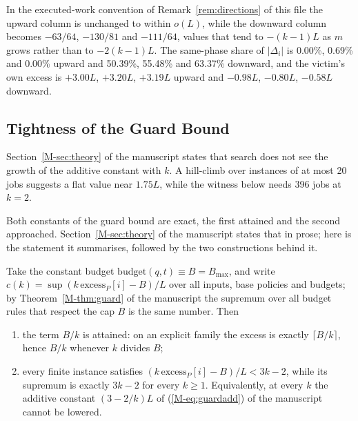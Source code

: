 \documentclass[mathematics,supfile,submit,moreauthors]{Definitions/mdpi}
\newcommand{\devnum}[1]{#1}
\begin{document}
In the executed-work convention of Remark~\ref{rem:directions} of this file the upward
column is unchanged to within $o(L)$, while the downward column becomes
$-63/64$, $-130/81$ and $-111/64$, values that tend to $-(k-1)L$ as $m$ grows
rather than to $-2(k-1)L$.
The same-phase share of $|\Delta_i|$ is \devnum{0.00\%}, \devnum{0.69\%} and
\devnum{0.00\%} upward and \devnum{50.39\%}, \devnum{55.48\%} and
\devnum{63.37\%} downward, and the victim's own excess is
\devnum{$+3.00L$}, \devnum{$+3.20L$}, \devnum{$+3.19L$} upward and
\devnum{$-0.98L$}, \devnum{$-0.80L$}, \devnum{$-0.58L$} downward.

\subsection{Tightness of the Guard Bound}
\label{sec:supp_tight2}

Section~\ref*{M-sec:theory} of the manuscript states that search does not see the growth of the additive
constant with $k$. A hill-climb over instances of at most \devnum{20} jobs suggests a
flat value near \devnum{$1.75L$}, while the witness below needs \devnum{396} jobs at
$k = \devnum{2}$.

Both constants of the guard bound are exact, the first attained and the second
approached. Section~\ref*{M-sec:theory} of the manuscript states that in prose; here is the statement it
summarises, followed by the two constructions behind it.

\begin{proposition}
\label{prop:tight2}
Take the constant budget $\mathrm{budget}(q,t) \equiv B = B_{\max}$, and write
$c(k) = \sup (k\,\mathrm{excess}_P[i] - B)/L$ over all inputs, base policies and
budgets; by Theorem~\ref*{M-thm:guard} of the manuscript the supremum over all budget rules that
respect the cap $B$ is the same number. Then
\begin{enumerate}
\item the term $B/k$ is attained: on an explicit family the excess is exactly
$\lceil B/k \rceil$, hence $B/k$ whenever $k$ divides $B$;
\item every finite instance satisfies
$(k\,\mathrm{excess}_P[i]-B)/L<3k-2$, while its supremum is exactly $3k-2$
for every $k \ge 1$. Equivalently, at every $k$ the additive constant
$(3 - 2/k)L$ of (\ref*{M-eq:guardadd}) of the manuscript cannot be lowered.
\end{enumerate}
\end{proposition}
\end{document}
